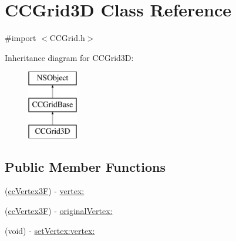 \hypertarget{interface_c_c_grid3_d}{\section{C\-C\-Grid3\-D Class Reference}
\label{interface_c_c_grid3_d}
}


{\ttfamily \#import $<$C\-C\-Grid.\-h$>$}

Inheritance diagram for C\-C\-Grid3\-D\-:\begin{figure}[H]
\begin{center}
\leavevmode
\includegraphics[height=3.000000cm]{interface_c_c_grid3_d}
\end{center}
\end{figure}
\subsection*{Public Member Functions}
\begin{DoxyCompactItemize}
\item 
(\hyperlink{cc_types_8h_a351ac51e9885af9a15676faf8cb49f8a}{cc\-Vertex3\-F}) -\/ \hyperlink{interface_c_c_grid3_d_a50b78b9f959183fc95ce5fe119808957}{vertex\-:}
\item 
(\hyperlink{cc_types_8h_a351ac51e9885af9a15676faf8cb49f8a}{cc\-Vertex3\-F}) -\/ \hyperlink{interface_c_c_grid3_d_afc3bb846e799e0e1fab988893291a63a}{original\-Vertex\-:}
\item 
(void) -\/ \hyperlink{interface_c_c_grid3_d_a460f7269efb45e76411d5fe18eebce3d}{set\-Vertex\-:vertex\-:}
\end{DoxyCompactItemize}
